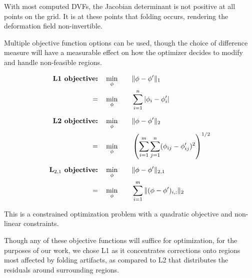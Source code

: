 
With most computed DVFs, the Jacobian determinant is not positive at all points on the grid. It is at these points that folding occurs, rendering the deformation field non-invertible.


Multiple objective function options can be used, though the choice of difference measure will have a measurable effect on how the optimizer decides to modify and handle non-feasible regions.   

\begin{alignat}{2}
\textbf{L1 objective:} \quad & \min_{\phi} \quad && \|\phi - \phi'\|_1 \notag \\
=\quad & \min_{\phi} \quad && \sum_{i=1}^{n} |\phi_i - \phi_i'| \\[6pt]
\textbf{L2 objective:} \quad & \min_{\phi} \quad && \|\phi - \phi'\|_2 \notag \\
=\quad & \min_{\phi} \quad && \left( \sum_{i=1}^{m} \sum_{j=1}^{n} (\phi_{ij} - \phi'_{ij})^2 \right)^{1/2}
 \\[6pt]
 \textbf{L$_{2,1}$ objective:} \quad & \min_{\phi} \quad && \|\phi - \phi'\|_{2,1} \notag \\
 =\quad & \min_{\phi} \quad && \sum_{i=1}^{m} \|(\phi - \phi')_{i,:}\|_2
\end{alignat}

This is a constrained optimization problem with a quadratic objective and non-linear constraints.


Though any of these objective functions will suffice for optimization, for the purposes of our work, we chose L1 as it concentrates corrections onto regions most affected by folding artifacts, as compared to L2 that distributes the residuals around surrounding regions.


